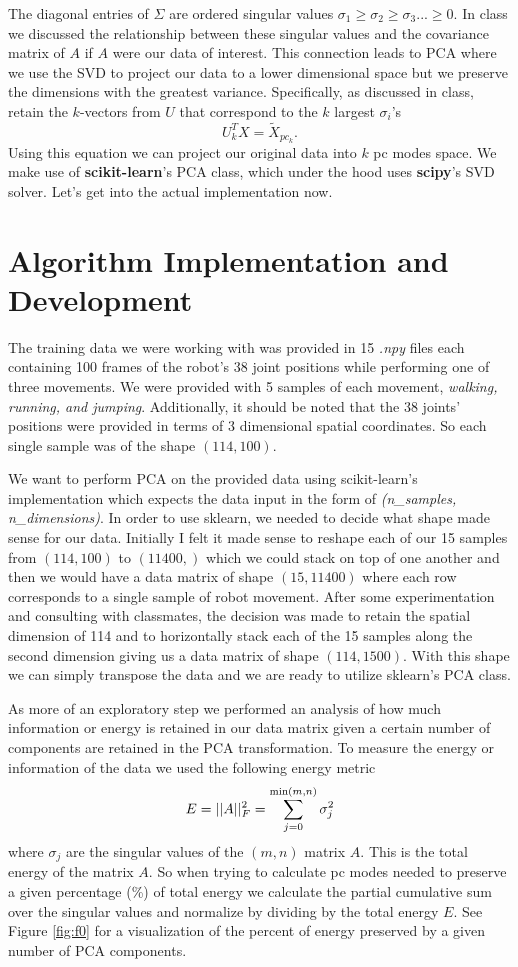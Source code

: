 \documentclass[11pt]{amsart}
\begin{document}
The diagonal entries of $\Sigma$ are ordered singular values $\sigma_1 \geq \sigma_2 \geq \sigma_3 ... \geq 0$.
In class we discussed the relationship between these singular values and the covariance matrix of $A$ if $A$ were our data of interest.
This connection leads to PCA where we use the SVD to project our data to a lower dimensional space but we preserve the dimensions with the greatest variance.
Specifically, as discussed in class, retain the $k$-vectors from $U$ that correspond to the $k$ largest $\sigma_i$'s
\begin{equation}
U^T_{k}X = \tilde X_{pc_k}.
\label{eq:eq_ammended}
\end{equation}
Using this equation we can project our original data into $k$ pc modes space.
We make use of \textbf{ scikit-learn}'s PCA class, which under the hood uses \textbf{scipy}'s SVD solver.
Let's get into the actual implementation now.

\section{Algorithm Implementation and Development}\label{sec:algorithms}
The training data we were working with was provided in 15 \textit{.npy } files each containing 100 frames of the robot's 38 joint positions while performing one of three movements.
We were provided with 5 samples of each movement, \textit{walking, running, {\rm and } jumping}.
Additionally, it should be noted that the 38 joints' positions were provided in terms of 3 dimensional spatial coordinates.
So each single sample was of the shape $(114,100)$.

We want to perform PCA on the provided data using scikit-learn's implementation which expects the data input in the form of \textit{(n\_samples, n\_dimensions)}.
In order to use sklearn, we needed to decide what shape made sense for our data.
Initially I felt it made sense to reshape each of our 15 samples from $(114,100)$ to $(11400,)$ which we could stack on top of one another and then we would have a data matrix of shape $(15, 11400)$ where each row corresponds to a single sample of robot movement.
After some experimentation and consulting with classmates, the decision was made to retain the spatial dimension of 114 and to horizontally stack each of the 15 samples along the second dimension giving us a data matrix of shape $(114, 1500)$.
With this shape we can simply transpose the data and we are ready to utilize sklearn's PCA class.

As more of an exploratory step we performed an analysis of how much information or energy is retained in our data matrix given a certain number of components are retained in the PCA transformation.
To measure the energy or information of the data we used the following energy metric
$$E = ||A||_F^2 = \sum_{j=0}^{ {\rm min}(m,n)} \sigma_j^2$$
where $\sigma_j$ are the singular values of the $(m,n)$ matrix $A$.
This is the total energy of the matrix $A$.
So when trying to calculate pc modes needed to preserve a given percentage (\%) of total energy we calculate the partial cumulative sum over the singular values and normalize by dividing by the total energy $E$.
See Figure \ref{fig:f0} for a visualization of the percent of energy preserved by a given number of PCA components.
\end{document}
